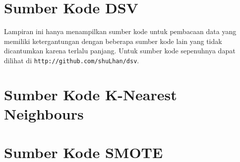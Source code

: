 \newpage
\section{Sumber Kode DSV}
\label{appendix:sumber_kode_dsv}

Lampiran ini hanya menampilkan sumber kode untuk pembacaan data yang memiliki ketergantungan dengan beberapa sumber kode lain yang tidak dicantumkan karena terlalu panjang. Untuk sumber kode sepenuhnya dapat dilihat di \texttt{http://github.com/shuLhan/dsv}.


\newpage
\section{Sumber Kode K-Nearest Neighbours}
\label{appendix:sumber_kode_knn}

\newpage
{}

\newpage
\section{Sumber Kode SMOTE}
\label{appendix:sumber_kode_smote}

